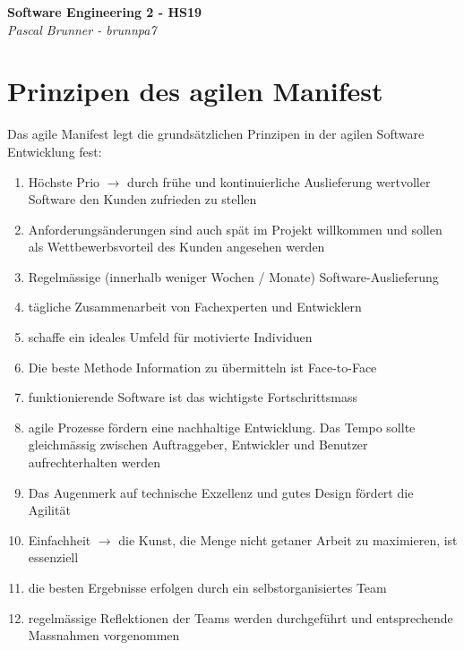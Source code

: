 \documentclass{report}
\theoremstyle{definition}
\theoremstyle{example}
\begin{document}
\begin{titlepage}
   \begin{center}
      \Large\textbf{Software Engineering 2 - HS19}\\
      \large\textit{Pascal Brunner - brunnpa7}
   \end{center}
\end{titlepage}


\tableofcontents
\newpage



\chapter{Prinzipen des agilen Manifest}
Das agile Manifest legt die grundsätzlichen Prinzipen in der agilen Software Entwicklung fest:
\begin{enumerate}
    \item Höchste Prio $\rightarrow$ durch frühe und kontinuierliche Auslieferung wertvoller Software den Kunden zufrieden zu stellen
    \item Anforderungsänderungen sind auch spät im Projekt willkommen und sollen als Wettbewerbsvorteil des Kunden angesehen werden
    \item Regelmässige (innerhalb weniger Wochen / Monate) Software-Auslieferung
    \item tägliche Zusammenarbeit von Fachexperten und Entwicklern
    \item schaffe ein ideales Umfeld für motivierte Individuen
    \item Die beste Methode Information zu übermitteln ist Face-to-Face
    \item funktionierende Software ist das wichtigste Fortschrittsmass
    \item agile Prozesse fördern eine nachhaltige Entwicklung. Das Tempo sollte gleichmässig zwischen Auftraggeber, Entwickler und Benutzer aufrechterhalten werden
    \item Das Augenmerk auf technische Exzellenz und gutes Design fördert die Agilität
    \item Einfachheit $\rightarrow$ die Kunst, die Menge nicht getaner Arbeit zu maximieren, ist essenziell
    \item die besten Ergebnisse erfolgen durch ein selbstorganisiertes Team
    \item regelmässige Reflektionen der Teams werden durchgeführt und entsprechende Massnahmen vorgenommen
\end{enumerate}
\end{document}
